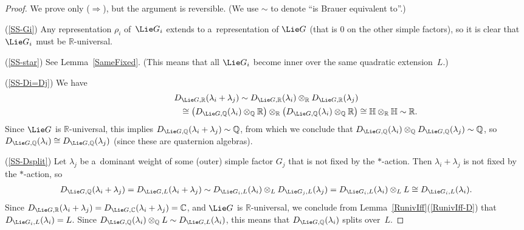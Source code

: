 \documentclass[pdftex]{sigma}
\numberwithin{equation}{section}
\begin{document}
\begin{proof}
We prove only ($\Rightarrow$), but the argument is reversible.
(We use $\sim$ to denote ``is Brauer equivalent to''.)

(\ref{SS-Gi}) Any representation $\rho_i$ of~$\Lie G_i$ extends to a~representation of $\Lie G$ (that is $0$ on the
other simple factors), so it is clear that $\Lie G_i$ must be $\mathbb{R}$-universal.

(\ref{SS-star}) See Lemma~\ref{SameFixed}.
(This means that all $\Lie G_i$ become inner over the same quadratic extension~$L$.)

(\ref{SS-Di=Dj}) We have
\begin{gather*}
D_{\Lie G, \mathbb{R}}(\lambda_i + \lambda_j) \sim D_{\Lie G, \mathbb{R}}(\lambda_i) \otimes_\mathbb{R} D_{\Lie G,
\mathbb{R}}(\lambda_j) \\
\hphantom{D_{\Lie G, \mathbb{R}}(\lambda_i + \lambda_j)}{}
\cong \bigl(D_{\Lie G, \mathbb{Q}}(\lambda_i) \otimes_\mathbb{Q} \mathbb{R} \bigr)
\otimes_\mathbb{R} \bigl(D_{\Lie G, \mathbb{Q}}(\lambda_i) \otimes_\mathbb{Q} \mathbb{R} \bigr) \cong \mathbb{H}
\otimes_\mathbb{R} \mathbb{H} \sim \mathbb{R}.
\end{gather*}
Since $\Lie G$ is $\mathbb{R}$-universal, this implies $D_{\Lie G, \mathbb{Q}}(\lambda_i + \lambda_j) \sim\mathbb{Q}$,
from which we conclude that $D_{\Lie G, \mathbb{Q}}(\lambda_i) \otimes_\mathbb{Q} D_{\Lie G, \mathbb{Q}}(\lambda_j) \sim
\mathbb{Q}$, so $D_{\Lie G, \mathbb{Q}}(\lambda_i) \cong D_{\Lie G, \mathbb{Q}}(\lambda_j)$ (since these are quaternion
algebras).

(\ref{SS-Dsplit}) Let $\lambda_j$ be a~dominant weight of some (outer) simple factor $G_j$ that is not f\/ixed by the
$*$-action.
Then $\lambda_i + \lambda_j$ is not f\/ixed by the $*$-action, so
\begin{gather*}
D_{\Lie G, \mathbb{Q}}(\lambda_i + \lambda_j) = D_{\Lie G, L}(\lambda_i + \lambda_j) \sim D_{\Lie G_i, L}(\lambda_i)
\otimes_L D_{\Lie G_j, L}(\lambda_j) = D_{\Lie G_i, L}(\lambda_i) \otimes_L L \cong D_{\Lie G_i, L}(\lambda_i).
\end{gather*}
Since $D_{\Lie G, \mathbb{R}}(\lambda_i + \lambda_j) = D_{\Lie G, \mathbb{C}}(\lambda_i + \lambda_j) = \mathbb{C}$, and
$\Lie G$ is $\mathbb{R}$-universal, we conclude from Lemma~\ref{RunivIff}(\ref{RunivIff-D}) that $D_{\Lie G_i, L}(\lambda_i) = L$.
Since $D_{\Lie G, \mathbb{Q}}(\lambda_i) \otimes_\mathbb{Q} L \sim D_{\Lie G, L}(\lambda_i)$, this means that $D_{\Lie
G, \mathbb{Q}}(\lambda_i)$ splits over~$L$.
\end{proof}
\end{document}
